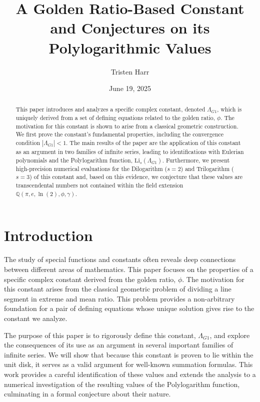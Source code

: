 \documentclass{amsart}
\theoremstyle{plain}
\theoremstyle{definition}
\theoremstyle{remark}
\newcommand{\LambdaG}{\Lambda_{G1}}
\begin{document}
\title[A Golden Ratio Constant and its Polylogarithmic Values]{A Golden Ratio-Based Constant and Conjectures on its Polylogarithmic Values}
\author{Tristen Harr}
\date{June 19, 2025}

\begin{abstract}
This paper introduces and analyzes a specific complex constant, denoted $\LambdaG$, which is uniquely derived from a set of defining equations related to the golden ratio, $\phi$. The motivation for this constant is shown to arise from a classical geometric construction. We first prove the constant's fundamental properties, including the convergence condition $|\LambdaG| < 1$. The main results of the paper are the application of this constant as an argument in two families of infinite series, leading to identifications with Eulerian polynomials and the Polylogarithm function, $\mathrm{Li}_s(\LambdaG)$. Furthermore, we present high-precision numerical evaluations for the Dilogarithm ($s=2$) and Trilogarithm ($s=3$) of this constant and, based on this evidence, we conjecture that these values are transcendental numbers not contained within the field extension $\mathbb{Q}(\pi, e, \ln(2), \phi, \gamma)$.
\end{abstract}

\maketitle

\section{Introduction}
The study of special functions and constants often reveals deep connections between different areas of mathematics. This paper focuses on the properties of a specific complex constant derived from the golden ratio, $\phi$. The motivation for this constant arises from the classical geometric problem of dividing a line segment in extreme and mean ratio. This problem provides a non-arbitrary foundation for a pair of defining equations whose unique solution gives rise to the constant we analyze.

The purpose of this paper is to rigorously define this constant, $\LambdaG$, and explore the consequences of its use as an argument in several important families of infinite series. We will show that because this constant is proven to lie within the unit disk, it serves as a valid argument for well-known summation formulas. This work provides a careful identification of these values and extends the analysis to a numerical investigation of the resulting values of the Polylogarithm function, culminating in a formal conjecture about their nature.
\end{document}
